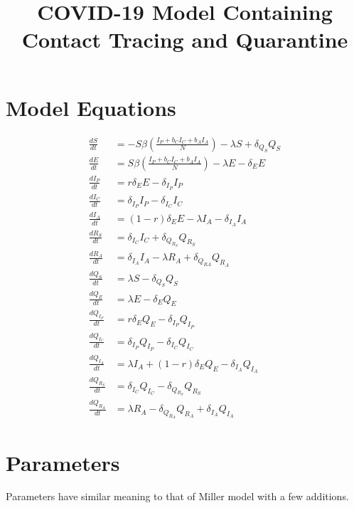 \documentclass[12pt]{article}
\title{COVID-19 Model Containing Contact Tracing and Quarantine}
\date{}
\begin{document}
 

\maketitle

\section{Model Equations} \label{equations}

\begin{equation}
\begin{aligned}
\frac{dS}{dt} &=  - S \beta \left( \frac{I_P + b_CI_C + b_AI_A}{N}\right) -\lambda S + \delta_{Q_S}  Q_S \\
\frac{dE}{dt} &= S \beta \left( \frac{I_P + b_CI_C + b_AI_A}{N}\right)  -\lambda E - \delta_E E \\
\frac{dI_P}{dt} &= r\delta_E E - \delta_{I_P} I_P\\
\frac{dI_C}{dt} &= \delta_{I_P} I_P - \delta_{I_C} I_C\\
\frac{dI_A}{dt} &= (1-r) \delta_E E - \lambda I_A - \delta_{I_A} I_A\\
\frac{dR_S}{dt} &= \delta_{I_C} I_C +  \delta_{Q_{R_S}} Q_{R_S}\\
\frac{dR_A}{dt} &= \delta_{I_A} I_A - \lambda R_A + \delta_{Q_{RA}} Q_{R_A}\\
\frac{dQ_S}{dt} &= \lambda S  - \delta_{Q_S} Q_{S}\\
\frac{dQ_E}{dt} &= \lambda E - \delta_E Q_E\\
\frac{dQ_{I_P}}{dt} &= r \delta_E Q_E -\delta_{I_P} Q_{I_P}\\
\frac{dQ_{I_C}}{dt} &= \delta_{I_P} Q_{I_P} - \delta_{I_C} Q_{I_C}\\
\frac{dQ_{I_A}}{dt} &= \lambda I_A + (1-r)\delta_E Q_E -\delta_{I_A} Q_{I_A}\\
\frac{dQ_{R_S}}{dt} &= \delta_{I_C} Q_{I_C} - \delta_{Q_{R_S}} Q_{R_S}\\
\frac{dQ_{R_A}}{ dt} &= \lambda R_A -\delta_{Q_{R_A}}Q_{R_A} + \delta_{I_A} Q_{I_A}
\end{aligned}
\end{equation}


\section{Parameters} \label{parameters}
Parameters have similar meaning to that of Miller model with a few additions.
\end{document}
